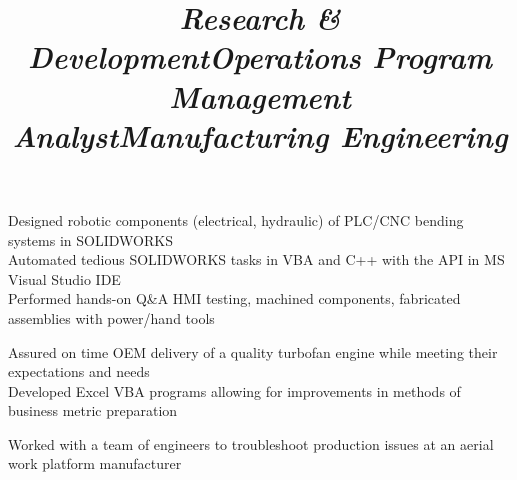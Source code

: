 \documentclass[mm]{res}
\newcommand{\tb}{\textbullet \xspace}
\begin{document}
\begin{resume}
\title{\textsl{Research \& Development}}
\begin{position}
\tb Designed robotic components (electrical, hydraulic) of PLC/CNC bending systems in SOLIDWORKS \\
\tb Automated tedious SOLIDWORKS tasks in VBA and C++ with the API in MS Visual Studio IDE \\
\tb Performed hands-on Q\&A HMI testing, machined components, fabricated assemblies with power/hand tools
\end{position}

\title{\textsl{Operations Program Management Analyst}}
\begin{position}
\tb Assured on time OEM delivery of a quality turbofan engine while meeting their expectations and needs \\
\tb Developed Excel VBA programs allowing for improvements in methods of business metric preparation
\end{position}

\title{\textsl{Manufacturing Engineering}}
\begin{position}
\tb Worked with a team of engineers to troubleshoot production issues at an aerial work platform manufacturer
\end{position}



\end{resume}
\end{document}
